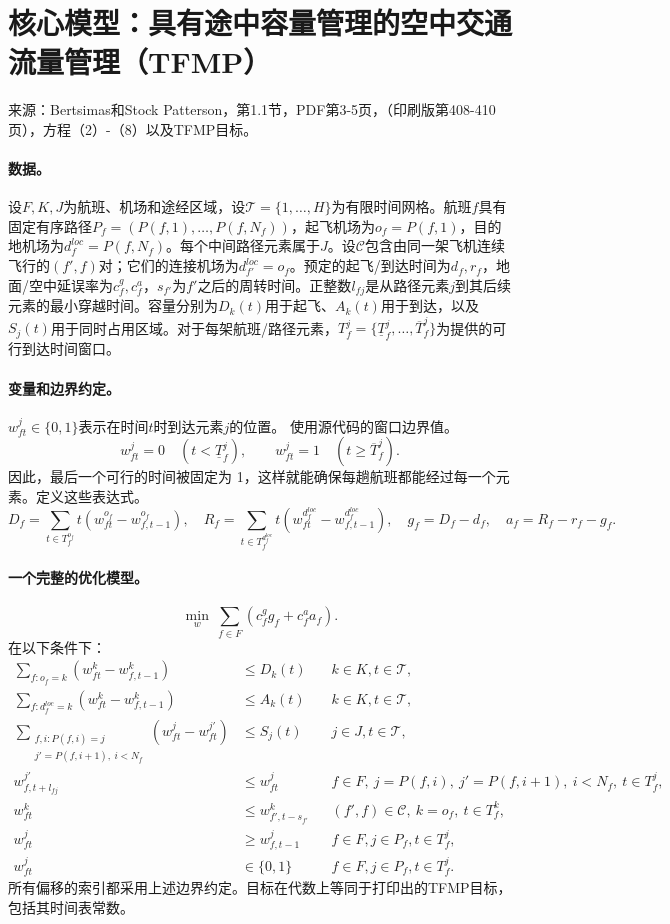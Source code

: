 \documentclass[11pt]{article}
\begin{document}
\section*{核心模型：具有途中容量管理的空中交通流量管理（TFMP）}
来源：Bertsimas和Stock Patterson，第1.1节，PDF第3-5页，（印刷版第408-410页），方程（2）-（8）以及TFMP目标。

\paragraph{数据。}
设$F,K,J$为航班、机场和途经区域，设$\mathcal T=\{1,\ldots,H\}$为有限时间网格。航班$f$具有固定有序路径$P_f=(P(f,1),\ldots,P(f,N_f))$，起飞机场为$o_f=P(f,1)$，目的地机场为$d_f^{loc}=P(f,N_f)$。每个中间路径元素属于$J$。设$\mathcal C$包含由同一架飞机连续飞行的$(f',f)$对；它们的连接机场为$d_{f'}^{loc}=o_f$。预定的起飞/到达时间为$d_f,r_f$，地面/空中延误率为$c_f^g,c_f^a$，$s_{f'}$为$f'$之后的周转时间。正整数$l_{fj}$是从路径元素$j$到其后续元素的最小穿越时间。容量分别为$D_k(t)$用于起飞、$A_k(t)$用于到达，以及$S_j(t)$用于同时占用区域。对于每架航班/路径元素，$T_f^j=\{\underline T_f^j,\ldots,\overline T_f^j\}$为提供的可行到达时间窗口。
\paragraph{变量和边界约定。}
$w_{ft}^j\in\{0,1\}$表示在时间$t$时到达元素$j$的位置。  
使用源代码的窗口边界值。
\[
w_{ft}^j=0\quad(t<\underline T_f^j),\qquad
w_{ft}^j=1\quad(t\ge\overline T_f^j).
\]
因此，最后一个可行的时间被固定为 1，这样就能确保每趟航班都能经过每一个元素。定义这些表达式。
\[
D_f=\sum_{t\in T_f^{o_f}}t(w_{ft}^{o_f}-w_{f,t-1}^{o_f}),\quad
R_f=\sum_{t\in T_f^{d_f^{loc}}}t(w_{ft}^{d_f^{loc}}-w_{f,t-1}^{d_f^{loc}}),
\quad g_f=D_f-d_f,\quad a_f=R_f-r_f-g_f.
\]
\paragraph{一个完整的优化模型。}
\[
\min_w\ \sum_{f\in F}(c_f^g g_f+c_f^a a_f).
\]
在以下条件下：
\begin{align}
\sum_{f:o_f=k}(w_{ft}^k-w_{f,t-1}^k)&\le D_k(t)
 &&k\in K,t\in\mathcal T,\tag{2}\\
\sum_{f:d_f^{loc}=k}(w_{ft}^k-w_{f,t-1}^k)&\le A_k(t)
 &&k\in K,t\in\mathcal T,\tag{3}\\
\sum_{\substack{f,i:P(f,i)=j\\j'=P(f,i+1),\ i<N_f}}
 (w_{ft}^{j}-w_{ft}^{j'})&\le S_j(t)
 &&j\in J,t\in\mathcal T,\tag{4}\\
w_{f,t+l_{fj}}^{j'}&\le w_{ft}^{j}
 &&f\in F,\ j=P(f,i),\ j'=P(f,i+1),\ i<N_f,\ t\in T_f^j,\tag{5}\\
w_{ft}^{k}&\le w_{f',t-s_{f'}}^{k}
 &&(f',f)\in\mathcal C,\ k=o_f,\ t\in T_f^k,\tag{6}\\
w_{ft}^{j}&\ge w_{f,t-1}^{j}
 &&f\in F,j\in P_f,t\in T_f^j,\tag{7}\\
w_{ft}^{j}&\in\{0,1\}
 &&f\in F,j\in P_f,t\in T_f^j.\tag{8}
\end{align}
所有偏移的索引都采用上述边界约定。目标在代数上等同于打印出的TFMP目标，包括其时间表常数。
\end{document}
